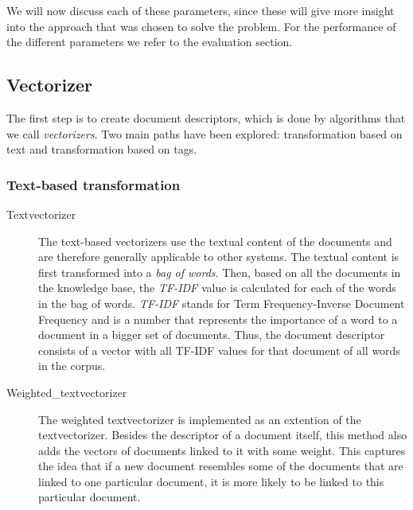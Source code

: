 We will now discuss each of these parameters, since these will give more insight into the approach that was chosen to solve the problem. For the performance of the different parameters we refer to the evaluation section. 

\subsection{Vectorizer}
The first step is to create document descriptors, which is done by algorithms that we call \emph{vectorizers}. Two main paths have been explored: transformation based on text and transformation based on tags.

\subsubsection{Text-based transformation}
\begin{description}
\item [Textvectorizer] The text-based vectorizers use the textual content of the documents and are therefore generally applicable to other systems. The textual content is first transformed into a \emph{bag of words}. Then, based on all the documents in the knowledge base, the \emph{TF-IDF} value is calculated for each of the words in the bag of words. \emph{TF-IDF} stands for Term Frequency-Inverse Document Frequency and is a number that represents the importance of a word to a document in a bigger set of documents. Thus, the document descriptor consists of a vector with all TF-IDF values for that document of all words in the corpus. 

\item[Weighted\_textvectorizer] The weighted textvectorizer is implemented as an extention of the textvectorizer. Besides the descriptor of a document itself, this method also adds the vectors of documents linked to it with some weight. This captures the idea that if a new document resembles some of the documents that are linked to one particular document, it is more likely to be linked to this particular document. 
\end{description}

